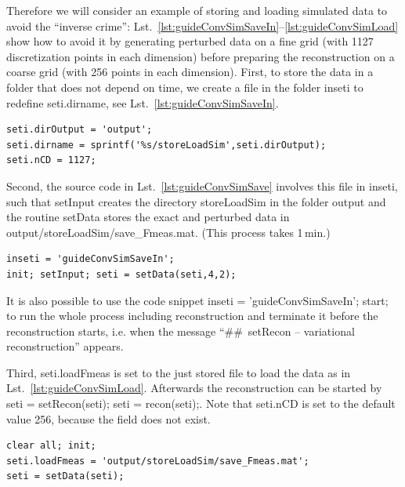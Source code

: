 \documentclass[a4paper]{article}
\begin{document}
Therefore we will consider an example of storing and loading simulated data to avoid the ``inverse crime'': Lst.~\ref{lst:guideConvSimSaveIn}--\ref{lst:guideConvSimLoad} show how to avoid it by generating perturbed data on a fine grid (with 1127 discretization points in each dimension) before preparing the reconstruction on a coarse grid (with 256 points in each dimension). First, to store the data in a folder that does not depend on time, we create a file in the folder \textsf{inseti} to redefine \textsf{seti.dirname}, see Lst.~\ref{lst:guideConvSimSaveIn}.

\begin{lstlisting}[caption={File \textsf{inseti/guideConvSimSaveIn.m} with input parameters to save data.},label=lst:guideConvSimSaveIn]
seti.dirOutput = 'output';
seti.dirname = sprintf('%s/storeLoadSim',seti.dirOutput);
seti.nCD = 1127;
\end{lstlisting}

Second, the source code in Lst.~\ref{lst:guideConvSimSave} involves this file in \textsf{inseti}, such that \textsf{setInput} creates the directory \textsf{storeLoadSim} in the folder \textsf{output} and the routine \textsf{setData} stores the exact and perturbed data in \textsf{output/\allowbreak storeLoadSim/\allowbreak save\_Fmeas.mat}. (This process takes 1\,min.)

\begin{lstlisting}[caption={Simulate data and save them (\emph{source code}: \textsf{inseti/guideConvSimSave.m}).},label=lst:guideConvSimSave]
inseti = 'guideConvSimSaveIn';
init; setInput; seti = setData(seti,4,2);
\end{lstlisting}

It is also possible to use the code snippet \textsf{inseti = 'guideConvSimSaveIn'; start;} to run the whole process including reconstruction and terminate it before the reconstruction starts, i.e. when the message ``\textsf{\#\#~setRecon -- variational reconstruction}'' appears.

Third, \textsf{seti.loadFmeas} is set to the just stored file to load the data as in Lst.~\ref{lst:guideConvSimLoad}. 
%
Afterwards the reconstruction can be started by \textsf{seti = setRecon(seti); seti = recon(seti);}. Note that \textsf{seti.nCD} is set to the default value 256, because the field does not exist. 

\begin{lstlisting}[caption={Load exact and perturbed data (\emph{source code}: \textsf{guides/guideConvSimLoad.m}).},label=lst:guideConvSimLoad]
clear all; init;
seti.loadFmeas = 'output/storeLoadSim/save_Fmeas.mat';
seti = setData(seti);
\end{lstlisting}
\end{document}
